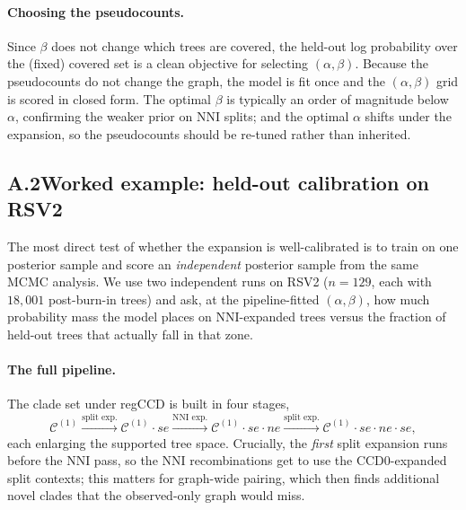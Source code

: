 \documentclass{article}
\newcommand{\CC}{\mathcal{C}}
\begin{document}
\paragraph{Choosing the pseudocounts.}
Since $\beta$ does not change which trees are covered, the held-out log
probability over the (fixed) covered set is a clean objective for selecting
$(\alpha,\beta)$. Because the pseudocounts do not change the graph, the model is
fit once and the $(\alpha,\beta)$ grid is scored in closed form. The optimal
$\beta$ is typically an order of magnitude below $\alpha$, confirming the weaker
prior on NNI splits; and the optimal $\alpha$ shifts under the expansion, so the
pseudocounts should be re-tuned rather than inherited.

\subsection*{A.2\quad Worked example: held-out calibration on RSV2}

The most direct test of whether the expansion is well-calibrated is to train on
one posterior sample and score an \emph{independent} posterior sample from the
same MCMC analysis. We use two independent runs on RSV2 ($n=129$, each with
$18{,}001$ post-burn-in trees) and ask, at the pipeline-fitted $(\alpha,\beta)$,
how much probability mass the model places on NNI-expanded trees versus the
fraction of held-out trees that actually fall in that zone.

\paragraph{The full pipeline.}
The clade set under regCCD is built in four stages,
\begin{equation}
  \CC^{(1)} \xrightarrow{\text{split exp.}} \CC^{(1)}\!\cdot se
  \xrightarrow{\text{NNI exp.}} \CC^{(1)}\!\cdot se\cdot ne
  \xrightarrow{\text{split exp.}} \CC^{(1)}\!\cdot se\cdot ne\cdot se ,
  \label{eq:pipeline}
\end{equation}
each enlarging the supported tree space. Crucially, the \emph{first} split
expansion runs before the NNI pass, so the NNI recombinations get to use the
CCD0-expanded split contexts; this matters for graph-wide pairing, which then
finds additional novel clades that the observed-only graph would miss.
\end{document}
